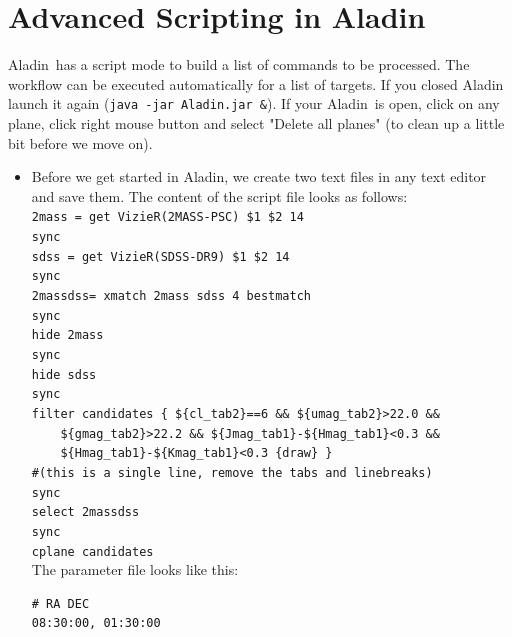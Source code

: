 \documentclass [a4paper, 12pt]{article}
\newcommand{\aladin}{{\textsc{A}{ladin}}}
\begin{document}
\section{Advanced Scripting in \aladin}
\aladin\ has a script mode to build a list of commands to be processed. The 
workflow can be executed automatically for a list of targets. If you closed 
\aladin\, launch it again (\texttt{java -jar Aladin.jar \&}). If your \aladin\ 
is open, click on any plane, click right mouse button and select "Delete all 
planes" (to clean up a little bit before we move on). 
\newpage
\begin{itemize}
    
\item Before we get started in \aladin, we create two text files in any text 
editor and save them. The content of the script file looks as follows:\\

\texttt{2mass = get VizieR(2MASS-PSC) \$1 \$2 14\textquotesingle}\\
\texttt{sync}\\
\texttt{sdss = get VizieR(SDSS-DR9) \$1 \$2 14\textquotesingle}\\
\verb|sync|\\
\verb|2massdss= xmatch 2mass sdss 4 bestmatch|\\
\verb|sync|\\
\verb|hide 2mass|\\
\verb|sync|\\
\verb|hide sdss|\\
\verb|sync|\\
\verb|filter candidates { ${cl_tab2}==6 && ${umag_tab2}>22.0 && |\\
\verb|    ${gmag_tab2}>22.2 && ${Jmag_tab1}-${Hmag_tab1}<0.3 &&|\\
\verb|    ${Hmag_tab1}-${Kmag_tab1}<0.3 {draw} }|\\
\verb|#(this is a single line, remove the tabs and linebreaks)|\\
\verb|sync|\\
\verb|select 2massdss|\\
\verb|sync|\\
\verb|cplane candidates|\\

The parameter file looks like this:
\begin{verbatim}
# RA DEC
08:30:00, 01:30:00
\end{verbatim}


\end{itemize}
\end{document}
